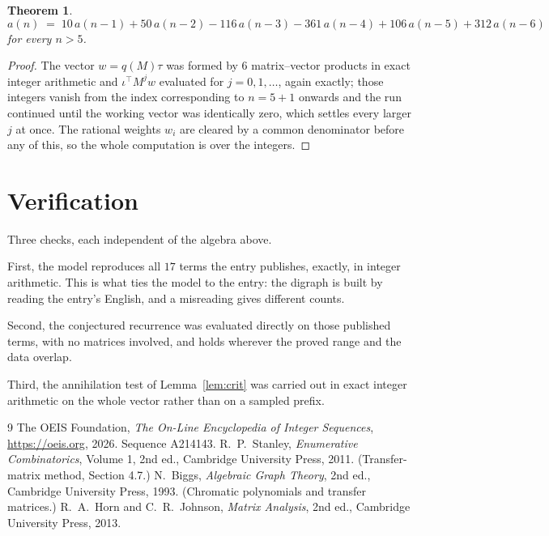 \documentclass[11pt,a4paper]{article}
\theoremstyle{plain}
\newtheorem{theorem}{Theorem}
\theoremstyle{definition}
\begin{document}
\begin{theorem}
\[
a(n)\;=\;10\,a(n-1) + 50\,a(n-2) - 116\,a(n-3) - 361\,a(n-4) + 106\,a(n-5) + 312\,a(n-6)
\]
for every $n>5$.
\end{theorem}

\begin{proof}
The vector $w=q(M)\tau$ was formed by $6$ matrix--vector products in exact integer
arithmetic and $\iota^{\!\top}M^{j}w$ evaluated for $j=0,1,\dots$, again exactly; those
integers vanish from the index corresponding to $n=5+1$ onwards and the run continued
until the working vector was identically zero, which settles every larger $j$ at once. The
rational weights $w_i$ are cleared by a common denominator before any of this, so the whole
computation is over the integers.
\end{proof}

\section{Verification}

Three checks, each independent of the algebra above.

First, the model reproduces all $17$ terms the entry publishes, exactly, in integer
arithmetic. This is what ties the model to the entry: the digraph is built by reading the
entry's English, and a misreading gives different counts.

Second, the conjectured recurrence was evaluated directly on those published terms, with no
matrices involved, and holds wherever the proved range and the data overlap.

Third, the annihilation test of Lemma~\ref{lem:crit} was carried out in exact integer
arithmetic on the whole vector rather than on a sampled prefix.

\begin{thebibliography}{9}
 The OEIS Foundation, \emph{The On-Line Encyclopedia of Integer
Sequences}, \url{https://oeis.org}, 2026. Sequence A214143.
 R.~P.~Stanley, \emph{Enumerative Combinatorics}, Volume 1, 2nd ed.,
Cambridge University Press, 2011. (Transfer-matrix method, Section 4.7.)
 N.~Biggs, \emph{Algebraic Graph Theory}, 2nd ed., Cambridge University
Press, 1993. (Chromatic polynomials and transfer matrices.)
 R.~A.~Horn and C.~R.~Johnson, \emph{Matrix Analysis}, 2nd ed., Cambridge
University Press, 2013.
\end{thebibliography}
\end{document}
